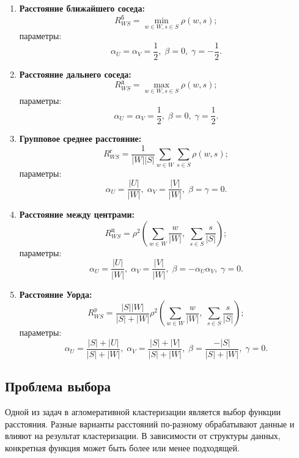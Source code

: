 \begin{enumerate}
    \item \textbf{Расстояние ближайшего соседа:}
          \[
              R^{б}_{WS} = \min_{w \in W, s \in S} \rho(w, s);
          \]
          параметры:
          \[
              \alpha_U = \alpha_V = \frac{1}{2}, \; \beta = 0, \; \gamma = -\frac{1}{2}.
          \]

    \item \textbf{Расстояние дальнего соседа:}
          \[
              R^{д}_{WS} = \max_{w \in W, s \in S} \rho(w, s);
          \]
          параметры:
          \[
              \alpha_U = \alpha_V = \frac{1}{2}, \; \beta = 0, \; \gamma = \frac{1}{2}.
          \]

    \item \textbf{Групповое среднее расстояние:}
          \[
              R^{г}_{WS} = \frac{1}{|W||S|} \sum_{w \in W} \sum_{s \in S} \rho(w, s);
          \]
          параметры:
          \[
              \alpha_U = \frac{|U|}{|W|}, \; \alpha_V = \frac{|V|}{|W|}, \; \beta = \gamma = 0.
          \]

    \item \textbf{Расстояние между центрами:}
          \[
              R^{ц}_{WS} = \rho^2 \left( \sum_{w \in W} \frac{w}{|W|}, \; \sum_{s \in S} \frac{s}{|S|} \right);
          \]
          параметры:
          \[
              \alpha_U = \frac{|U|}{|W|}, \; \alpha_V = \frac{|V|}{|W|}, \; \beta = -\alpha_U \alpha_V, \; \gamma = 0.
          \]

    \item \textbf{Расстояние Уорда:}
          \[
              R^{y}_{WS} = \frac{|S||W|}{|S| + |W|} \rho^2 \left( \sum_{w \in W} \frac{w}{|W|}, \; \sum_{s \in S} \frac{s}{|S|} \right);
          \]
          параметры:
          \[
              \alpha_U = \frac{|S| + |U|}{|S| + |W|}, \; \alpha_V = \frac{|S| + |V|}{|S| + |W|}, \; \beta = \frac{-|S|}{|S| + |W|}, \; \gamma = 0.
          \]
\end{enumerate}

\subsection{Проблема выбора}
Одной из задач в агломеративной кластеризации является выбор функции расстояния. Разные варианты расстояний по-разному обрабатывают данные и влияют на результат кластеризации. В зависимости от структуры данных, конкретная функция может быть более или менее подходящей.

